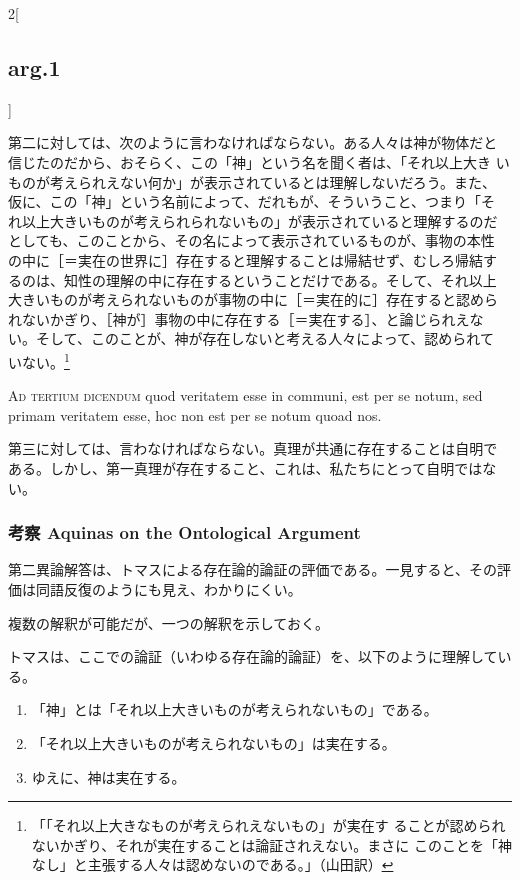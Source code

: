 \documentclass[paper=a4paper,fontsize=10pt,jafontsize=9pt,titlepage]{jlreq}
\begin{document}
\begin{paracol}{2}[\subsection{arg.1}]
\switchcolumn

第二に対しては、次のように言わなければならない。ある人々は神が物体だと
信じたのだから、おそらく、この「神」という名を聞く者は、「それ以上大き
いものが考えられえない何か」が表示されているとは理解しないだろう。また、
仮に、この「神」という名前によって、だれもが、そういうこと、つまり「そ
れ以上大きいものが考えられられないもの」が表示されていると理解するのだ
としても、このことから、その名によって表示されているものが、事物の本性
の中に［＝実在の世界に］存在すると理解することは帰結せず、むしろ帰結す
るのは、知性の理解の中に存在するということだけである。そして、それ以上
大きいものが考えられないものが事物の中に［＝実在的に］存在すると認めら
れないかぎり、［神が］事物の中に存在する［＝実在する］、と論じられえな
い。そして、このことが、神が存在しないと考える人々によって、認められて
いない。\footnote{「「それ以上大きなものが考えられえないもの」が実在す
ることが認められないかぎり、それが実在することは論証されえない。まさに
このことを「神なし」と主張する人々は認めないのである。」（山田訳）}

\switchcolumn*[\subsection{ad.3}]

{\scshape Ad tertium dicendum} quod veritatem esse in communi, est per se
notum, sed primam veritatem esse, hoc non est per se notum quoad nos.

\switchcolumn

第三に対しては、言わなければならない。真理が共通に存在することは自明で
ある。しかし、第一真理が存在すること、これは、私たちにとって自明ではな
い。

\end{paracol}
\newpage
\subsubsection*{考察 Aquinas on the Ontological Argument}
第二異論解答は、トマスによる存在論的論証の評価である。一見すると、その評
価は同語反復のようにも見え、わかりにくい。

複数の解釈が可能だが、一つの解釈を示しておく。

トマスは、ここでの論証（いわゆる存在論的論証）を、以下のように理解してい
る。

\begin{enumerate}
 \item 「神」とは「それ以上大きいものが考えられないもの」である。
 \item 「それ以上大きいものが考えられないもの」は実在する。
 \item ゆえに、神は実在する。
\end{enumerate}
\end{document}
